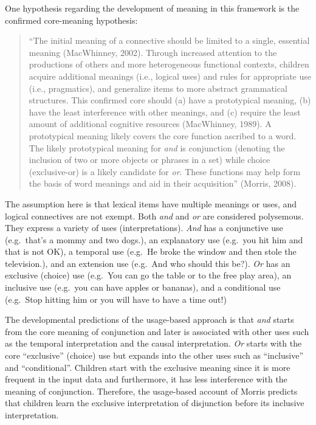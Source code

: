 \documentclass[oneside]{report}
\theoremstyle{definition}
\theoremstyle{definition}
\theoremstyle{definition}
\theoremstyle{remark}
\begin{document}
One hypothesis regarding the development of meaning in this framework is
the confirmed core-meaning hypothesis:
\begin{quote}
``The initial meaning of a connective should be limited to a single,
essential meaning (MacWhinney, 2002). Through increased attention to the
productions of others and more heterogeneous functional contexts,
children acquire additional meanings (i.e., logical uses) and rules for
appropriate use (i.e., pragmatics), and generalize items to more
abstract grammatical structures. This confirmed core should (a) have a
prototypical meaning, (b) have the least interference with other
meanings, and (c) require the least amount of additional cognitive
resources (MacWhinney, 1989). A prototypical meaning likely covers the
core function ascribed to a word. The likely prototypical meaning for
\emph{and} is conjunction (denoting the inclusion of two or more objects
or phrases in a set) while choice (exclusive-or) is a likely candidate
for \emph{or}. These functions may help form the basis of word meanings
and aid in their acquisition'' (Morris, 2008).
\end{quote}
The assumption here is that lexical items have multiple meanings or
uses, and logical connectives are not exempt. Both \emph{and} and
\emph{or} are considered polysemous. They express a variety of uses
(interpretations). \emph{And} has a conjunctive use (e.g.~that's a mommy
and two dogs.), an explanatory use (e.g.~you hit him and that is not
OK), a temporal use (e.g.~He broke the window and then stole the
television.), and an extension use (e.g.~And who should this be?).
\emph{Or} has an exclusive (choice) use (e.g.~You can go the table or to
the free play area), an inclusive use (e.g.~you can have apples or
bananas), and a conditional use (e.g.~Stop hitting him or you will have
to have a time out!)

The developmental predictions of the usage-based approach is that
\emph{and} starts from the core meaning of conjunction and later is
associated with other uses such as the temporal interpretation and the
causal interpretation. \emph{Or} starts with the core ``exclusive''
(choice) use but expands into the other uses such as ``inclusive'' and
``conditional''. Children start with the exclusive meaning since it is
more frequent in the input data and furthermore, it has less
interference with the meaning of conjunction. Therefore, the usage-based
account of Morris predicts that children learn the exclusive
interpretation of disjunction before its inclusive interpretation.
\end{document}
